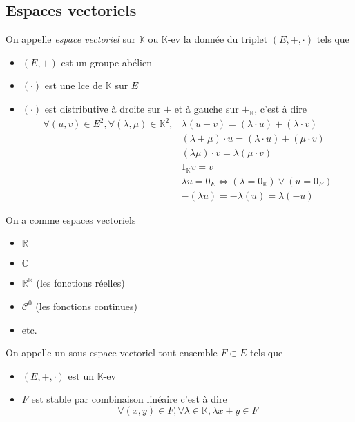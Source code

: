 \documentclass[11pt,colorlinks]{book}
\theoremstyle{mytheoremstyle}
\theoremstyle{mytheoremstyle}
\theoremstyle{mytheoremstyle}
\theoremstyle{mytheoremstyle}
\theoremstyle{mytheoremstyle}
\theoremstyle{mytheoremstyle}
\theoremstyle{mytheoremstyle}
\theoremstyle{mytheoremstyle}
\theoremstyle{myproblemstyle}
\def\mbb#1{\mathbb{#1}}
\def\mfc#1{\mathcal{#1}}
\def\bC{\mbb{C}}
\def\bR{\mbb{R}}
\def\bK{\mbb{K}}
\begin{document}
\subsection{Espaces vectoriels}
\begin{definition}
  On appelle \textit{espace vectoriel} sur $\bK$ ou $\bK$-ev la donnée du triplet $(E,+,\cdot)$ tels que 
  \begin{itemize}
    \item $(E,+)$ est un groupe abélien
    \item $(\cdot)$ est une lce de $\bK$ sur $E$ 
    \item $(\cdot)$ est distributive à droite sur $+$ et à gauche sur $+_{\bK}$, c'est à dire 
    \begin{align*}
      \forall (u,v) \in E^2, \forall (\lambda,\mu) \in \bK^2, &\lambda(u+v) = (\lambda \cdot u) + (\lambda \cdot v) \\ 
      &(\lambda + \mu) \cdot u = (\lambda \cdot u) + (\mu \cdot v) \\ 
      &(\lambda \mu) \cdot v = \lambda (\mu \cdot v) \\ 
      &1_{\bK} v = v \\
      &\lambda u = 0_E \Leftrightarrow (\lambda = 0_{\bK}) \vee (u = 0_E) \\ 
      &- (\lambda u) = -\lambda (u) = \lambda (-u)
    \end{align*}
  \end{itemize}
\end{definition}
\begin{rmq}
  On a comme espaces vectoriels 
  \begin{itemize}
    \item $\bR$
    \item $\bC$
    \item $\bR^{\bR}$ (les fonctions réelles)
    \item $\mfc{C}^0$ (les fonctions continues)
    \item etc.
  \end{itemize}
\end{rmq}
\begin{definition}
  On appelle un sous espace vectoriel tout ensemble $F \subset E$ tels que 
  \begin{itemize}
    \item $(E,+,\cdot)$ est un $\bK$-ev
    \item $F$ est stable par combinaison linéaire c'est à dire
    \begin{equation*}
      \forall (x,y) \in F, \forall \lambda \in \bK, \lambda x + y \in F
    \end{equation*}
  \end{itemize}
\end{definition}
\end{document}
